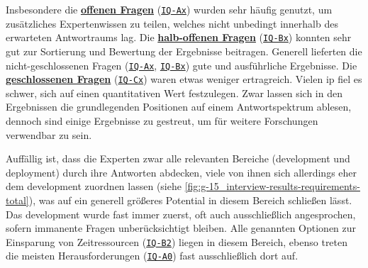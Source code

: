 Insbesondere die \textbf{\hyperref[subsec:AA-01-01_open-questions]{offenen Fragen}} (\texttt{\hyperref[subsec:AA-01-01_open-questions]{IQ-Ax}}) wurden sehr häufig genutzt, um zusätzliches Expertenwissen zu teilen, welches nicht unbedingt innerhalb des erwarteten Antwortraums lag. Die \textbf{\hyperref[subsec:AA-01-02_half-open-questions]{halb-offenen Fragen}} (\texttt{\hyperref[subsec:AA-01-02_half-open-questions]{IQ-Bx}}) konnten sehr gut zur Sortierung und Bewertung der Ergebnisse beitragen. Generell lieferten die nicht-geschlossenen Fragen (\texttt{\hyperref[subsec:AA-01-01_open-questions]{IQ-Ax}}, \texttt{\hyperref[subsec:AA-01-02_half-open-questions]{IQ-Bx}}) gute und ausführliche Ergebnisse. Die \textbf{\hyperref[subsec:AA-01-03_closed-questions]{geschlossenen Fragen}} (\texttt{\hyperref[subsec:AA-01-03_closed-questions]{IQ-Cx}}) waren etwas weniger ertragreich. Vielen \acrlong{ip} fiel es schwer, sich auf einen quantitativen Wert festzulegen. Zwar lassen sich in den Ergebnissen die grundlegenden Positionen auf einem Antwortspektrum ablesen, dennoch sind einige Ergebnisse zu gestreut, um für weitere Forschungen verwendbar zu sein.

Auffällig ist, dass die Experten zwar alle relevanten Bereiche (\Gls{development} und \Gls{deployment}) durch ihre Antworten abdecken, viele von ihnen sich allerdings eher dem \Gls{development} zuordnen lassen (siehe \autoref{fig:g-15_interview-results-requirements-total}), was auf ein generell größeres Potential in diesem Bereich schließen lässt. Das \Gls{development} wurde fast immer zuerst, oft auch ausschließlich angesprochen, sofern immanente Fragen unberücksichtigt bleiben. Alle genannten Optionen zur Einsparung von Zeitressourcen (\texttt{\hyperref[subsec:AA-03-02_half-open-questions]{IQ-B2}}) liegen in diesem Bereich, ebenso treten die meisten Herausforderungen (\texttt{\hyperref[subsec:AA-03-01_open-questions]{IQ-A0}}) fast ausschließlich dort auf.

